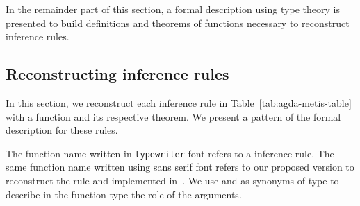 \documentclass[../main.tex]{subfiles}
\begin{document}
In the remainder part of this section, a formal description using
type theory is presented to build definitions and theorems of
functions necessary to reconstruct \Metis inference rules.


\subsection{Reconstructing \Metis inference rules}
\label{ssec:emulating-inferences}

In this section, we reconstruct each \Metis inference rule
in Table~\ref{tab:agda-metis-table} with a
function and its respective theorem. We present a pattern of the
formal description for these rules.

\begin{notation}

The function name written in \texttt{typewriter} font refers to a \Metis
inference rule. The same function name written using \textsf{sans serif} font
refers to our proposed version to reconstruct the rule and implemented
in~\cite{AgdaMetis}. We use \Source and \Target as synonyms of \Prop type to
describe in the function type the role of the arguments.

\end{notation}
\end{document}
